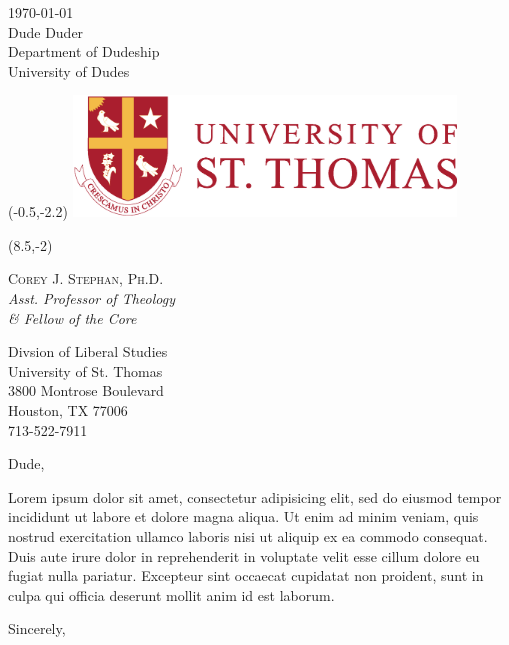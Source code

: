 \documentclass[letterpaper,12pt]{letter}
\date{}
\begin{document}
\begin{letter}{
	\today \\\bigskip %
	Dude Duder\\
	Department of Dudeship\\
	University of Dudes
}
                           
\begin{textblock}{4}(-0.5,-2.2)
\noindent
\hspace*{-0.35cm}\includegraphics[width=4in]{img/ust-logo.eps}
\end{textblock}

{
	\footnotesize %
	\usttext\begin{textblock}{3}(8.5,-2) %
		{
			\color{ustred}
			\noindent
			\textsc{Corey J. Stephan, Ph.D.}\\
			\emph{Asst. Professor of Theology \\ \& Fellow of the Core}
			
			Divsion of Liberal Studies \\			
			University of St. Thomas \\
			3800 Montrose Boulevard \\
			Houston, TX 77006 \\
			713-522-7911
		}
	\end{textblock}
}


	\opening{Dude,}

Lorem ipsum dolor sit amet, consectetur adipisicing elit, sed do eiusmod tempor incididunt ut labore et dolore magna aliqua. Ut enim ad minim veniam, quis nostrud exercitation ullamco laboris nisi ut aliquip ex ea commodo consequat. Duis aute irure dolor in reprehenderit in voluptate velit esse cillum dolore eu fugiat nulla pariatur. Excepteur sint occaecat cupidatat non proident, sunt in culpa qui officia deserunt mollit anim id est laborum.


\closing{\vspace{1cm}Sincerely,}
\end{letter}
\end{document}
